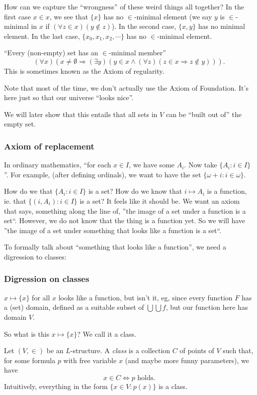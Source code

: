 \documentclass[a4paper]{article}
\begin{document}
How can we capture the ``wrongness'' of these weird things all together? In the first case $x\in x$, we see that $\{x\}$ has no $\in$-minimal element (we say $y$ is $\in$-minimal in $x$ if $(\forall z\in x)(y\not\in z)$). In the second case, $\{x, y\}$ has no minimal element. In the last case, $\{x_0, x_1, x_2, \cdots\}$ has no $\in$-minimal element.


\begin{axiom}
  ``Every (non-empty) set has an $\in$-minimal member''
  \[
    (\forall x)(x\not= \emptyset \Rightarrow  (\exists y)(y\in x\wedge (\forall z)(z\in x \Rightarrow  z\not\in y))).
  \]
  This is sometimes known as the Axiom of regularity.
\end{axiom}
Note that most of the time, we don't actually use the Axiom of Foundation. It's here just so that our universe ``looks nice''.

We will later show that this entails that all sets in $V$ can be ``built out of'' the empty set.

\subsubsection*{Axiom of replacement}
In ordinary mathematics, ``for each $x\in I$, we have some $A_i$. Now take $\{A_i: i\in I\}$''. For example, (after defining ordinals), we want to have the set $\{\omega + i: i\in \omega\}$.

How do we that $\{A_i: i\in I\}$ is a set? How do we know that $i\mapsto A_i$ is a function, ie. that $\{(i, A_i): i\in I\}$ is a set? It feels like it should be. We want an axiom that says, something along the line of, ''the image of a set under a function is a set``. However, we do not know  that the thing is a function yet. So we will have ''the image of a set under something that looks like a function is a set``.

To formally talk about ``something that looks like a function'', we need a digression to classes:

\subsubsection{Digression on classes}
$x\mapsto \{x\}$ for all $x$ looks like a function, but isn't it, eg, since every function $F$ has a (set) domain, defined as a suitable subset of $\bigcup \bigcup f$, but our function here has domain $V$.

So what is this $x\mapsto \{x\}$? We call it a class.
\begin{defi}[Class]
  Let $(V, \in)$ be an $L$-structure. A \emph{class} is a collection $C$ of points of $V$ such that, for some formula $p$ with free variable $x$ (and maybe more funny parameters), we have
  \[
    x\in C\Leftrightarrow p\text{ holds}.
  \]
  Intuitively, everything in the form $\{x\in V: p(x)\}$ is a class.
\end{defi}
\end{document}
